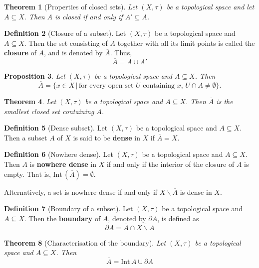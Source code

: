 \documentclass[10pt, oneside, reqno]{amsart}
\theoremstyle{plain}%
\newtheorem{thm}{Theorem}[section]
\newtheorem{prop}[thm]{Proposition}
\theoremstyle{definition}
\newtheorem{defn}[thm]{Definition}
\theoremstyle{remark}
\newcommand{\topo}{(X,\tau)}
\newcommand{\intr}{\text{Int}\,}
\newcommand{\ol}[1]{\overline{#1}}
\begin{document}
\begin{thm}[Properties of closed sets]
    Let $\topo$ be a topological space and let $A \subseteq X$.  Then $A$ is closed if and only if $A' \subseteq A$.
\end{thm}


\begin{defn}[Closure of a subset]
    Let $\topo$ be a topological space and $A \subseteq X$.  Then the set consisting of $A$ together with all its limit points is called the \textbf{closure} of $A$, and is denoted by $\ol A$.  Thus,\[
        \ol A = A \cup A'
    \]
\end{defn}

\begin{prop}
    Let $\topo$ be a topological space and $A \subseteq X$.  Then \[
        \ol A = \{ x \in X \, | \, \text{for every open set $U$ containing $x$, $U \cap A \neq \emptyset$} \}.
    \]
\end{prop}

\begin{thm}
        Let $\topo$ be a topological space and $A \subseteq X$.  Then $\ol A$ is the smallest closed set containing $A$.
\end{thm}

\begin{defn}[Dense subset]
        Let $\topo$ be a topological space and $A \subseteq X$.  Then a subset $A$ of $X$ is said to be \textbf{dense} in $X$ if $\ol A = X$.
\end{defn}

\begin{defn}[Nowhere dense]
        Let $\topo$ be a topological space and $A \subseteq X$. Then $A$ is \textbf{nowhere dense} in $X$ if and only if the interior of the closure of $A$ is empty.  That is, $\intr (\ol A) = \emptyset$.  
        
        Alternatively, a set is nowhere dense if and only if $X \backslash \ol A$ is dense in $X$.
\end{defn}

\begin{defn}[Boundary of a subset]
    Let $\topo$ be a topological space and $A \subseteq X$.  Then the \textbf{boundary} of $A$, denoted by $\partial A$, is defined as \[
        \partial A = \ol A \cap \ol{X \backslash A}
    \]
\end{defn}

\begin{thm}[Characterisation of the boundary]
        Let $\topo$ be a topological space and $A \subseteq X$. Then \[
            \ol A = \intr A \cup \partial A
        \]
\end{thm}
\end{document}
